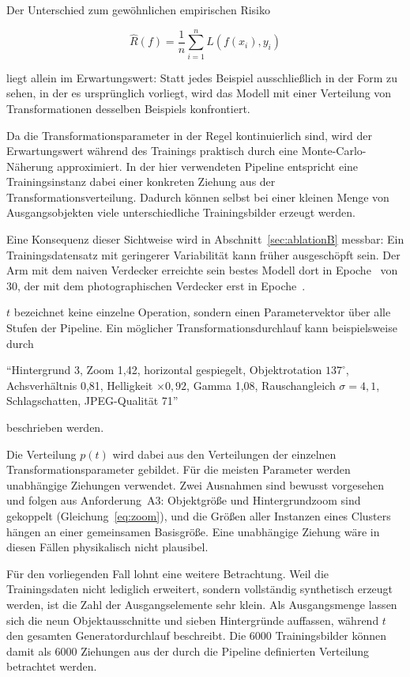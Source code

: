Der Unterschied zum gewöhnlichen empirischen Risiko

\begin{equation}
\hat{R}(f)
=
\frac{1}{n}
\sum_{i=1}^{n}
L\left(f(x_i),y_i\right)
\end{equation}

liegt allein im Erwartungswert: Statt jedes Beispiel ausschließlich in der Form zu sehen, in der es ursprünglich vorliegt, wird das Modell mit einer Verteilung von Transformationen desselben Beispiels konfrontiert.

Da die Transformationsparameter in der Regel kontinuierlich sind, wird der Erwartungswert während des Trainings praktisch durch eine Monte-Carlo-Näherung approximiert. In der hier verwendeten Pipeline entspricht eine Trainingsinstanz dabei einer konkreten Ziehung aus der Transformationsverteilung. Dadurch können selbst bei einer kleinen Menge von Ausgangsobjekten viele unterschiedliche Trainingsbilder erzeugt werden.

Eine Konsequenz dieser Sichtweise wird in Abschnitt~\ref{sec:ablationB} messbar: Ein Trainingsdatensatz mit geringerer Variabilität kann früher ausgeschöpft sein. Der Arm mit dem naiven Verdecker erreichte sein bestes Modell dort in Epoche~\zBTwoEpoche{} von 30, der mit dem photographischen Verdecker erst in Epoche~\zBZeroEpoche.

$ t $ bezeichnet keine einzelne Operation, sondern einen Parametervektor über alle Stufen der Pipeline. Ein möglicher Transformationsdurchlauf kann beispielsweise durch

\enquote{Hintergrund 3, Zoom 1,42, horizontal gespiegelt, Objektrotation $137^\circ$, Achsverhältnis 0,81, Helligkeit $\times 0{,}92$, Gamma 1,08, Rauschangleich $\sigma=4{,}1$, Schlagschatten, JPEG-Qualität 71}

beschrieben werden.

Die Verteilung $p(t)$ wird dabei aus den Verteilungen der einzelnen Transformationsparameter gebildet. Für die meisten Parameter werden unabhängige Ziehungen verwendet. Zwei Ausnahmen sind bewusst vorgesehen und folgen aus Anforderung~A3: Objektgröße und Hintergrundzoom sind gekoppelt (Gleichung~\eqref{eq:zoom}), und die Größen aller Instanzen eines Clusters hängen an einer gemeinsamen Basisgröße. Eine unabhängige Ziehung wäre in diesen Fällen physikalisch nicht plausibel.

Für den vorliegenden Fall lohnt eine weitere Betrachtung. Weil die Trainingsdaten nicht lediglich erweitert, sondern vollständig synthetisch erzeugt werden, ist die Zahl der Ausgangselemente sehr klein. Als Ausgangsmenge lassen sich die neun Objektausschnitte und sieben Hintergründe auffassen, während $t$ den gesamten Generatordurchlauf beschreibt. Die 6000 Trainingsbilder können damit als 6000 Ziehungen aus der durch die Pipeline definierten Verteilung betrachtet werden.

